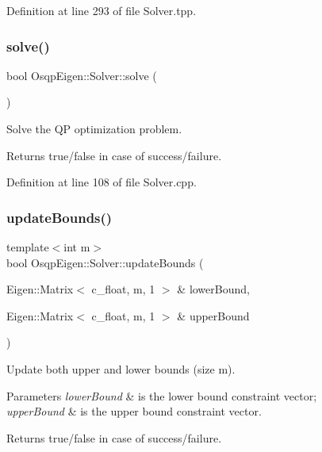 Definition at line 293 of file Solver.\+tpp.

\mbox{\label{classOsqpEigen_1_1Solver_aade83b0e68b85d47d41a054f04d413aa}} 
\subsubsection{\texorpdfstring{solve()}{solve()}}
{\footnotesize\ttfamily bool Osqp\+Eigen\+::\+Solver\+::solve (\begin{DoxyParamCaption}{ }\end{DoxyParamCaption})}



Solve the QP optimization problem. 

\begin{DoxyReturn}{Returns}
true/false in case of success/failure. 
\end{DoxyReturn}


Definition at line 108 of file Solver.\+cpp.

\mbox{\label{classOsqpEigen_1_1Solver_a1af39f37500a6bad6896e8e6699880fa}} 
\subsubsection{\texorpdfstring{update\+Bounds()}{updateBounds()}}
{\footnotesize\ttfamily template$<$int m$>$ \\
bool Osqp\+Eigen\+::\+Solver\+::update\+Bounds (\begin{DoxyParamCaption}\item[{Eigen\+::\+Matrix$<$ c\+\_\+float, m, 1 $>$ \&}]{lower\+Bound,  }\item[{Eigen\+::\+Matrix$<$ c\+\_\+float, m, 1 $>$ \&}]{upper\+Bound }\end{DoxyParamCaption})}



Update both upper and lower bounds (size m). 


\begin{DoxyParams}{Parameters}
{\em lower\+Bound} & is the lower bound constraint vector; \\
\hline
{\em upper\+Bound} & is the upper bound constraint vector. \\
\hline
\end{DoxyParams}
\begin{DoxyReturn}{Returns}
true/false in case of success/failure. 
\end{DoxyReturn}


